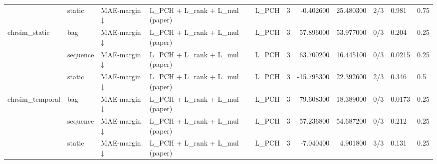 \begin{tabular}{lllllrrrlll}
 & static & MAE-margin ↓ & L\_PCH + L\_rank + L\_mul (paper) & L\_PCH & 3 & -0.402600 & 25.480300 & 2/3 & 0.981 & 0.75 \\
\cline{1-11} \cline{2-11} \cline{3-11}
\multirow[t]{3}{*}{ehrsim\_static} & bag & MAE-margin ↓ & L\_PCH + L\_rank + L\_mul (paper) & L\_PCH & 3 & 57.896000 & 53.977000 & 0/3 & 0.204 & 0.25 \\
\cline{2-11} \cline{3-11}
 & sequence & MAE-margin ↓ & L\_PCH + L\_rank + L\_mul (paper) & L\_PCH & 3 & 63.700200 & 16.445100 & 0/3 & 0.0215 & 0.25 \\
\cline{2-11} \cline{3-11}
 & static & MAE-margin ↓ & L\_PCH + L\_rank + L\_mul (paper) & L\_PCH & 3 & -15.795300 & 22.392600 & 2/3 & 0.346 & 0.5 \\
\cline{1-11} \cline{2-11} \cline{3-11}
\multirow[t]{3}{*}{ehrsim\_temporal} & bag & MAE-margin ↓ & L\_PCH + L\_rank + L\_mul (paper) & L\_PCH & 3 & 79.608300 & 18.389000 & 0/3 & 0.0173 & 0.25 \\
\cline{2-11} \cline{3-11}
 & sequence & MAE-margin ↓ & L\_PCH + L\_rank + L\_mul (paper) & L\_PCH & 3 & 57.236800 & 54.687200 & 0/3 & 0.212 & 0.25 \\
\cline{2-11} \cline{3-11}
 & static & MAE-margin ↓ & L\_PCH + L\_rank + L\_mul (paper) & L\_PCH & 3 & -7.040400 & 4.901800 & 3/3 & 0.131 & 0.25 \\
\cline{1-11} \cline{2-11} \cline{3-11}
\bottomrule
\end{tabular}
